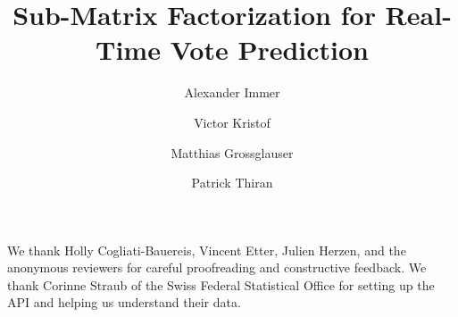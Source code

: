 \documentclass[sigconf]{acmart}
\begin{document}
\fancyhead{}

\title{Sub-Matrix Factorization for Real-Time Vote Prediction}

\author{Alexander Immer}

\author{Victor Kristof}
\authornotemark[1]

\author{Matthias Grossglauser}

\author{Patrick Thiran}

\renewcommand{\shortauthors}{Immer and Kristof, et al.}



\maketitle









\begin{acks}
	We thank Holly Cogliati-Bauereis, Vincent Etter, Julien Herzen, and the anonymous reviewers for careful proofreading and constructive feedback.
	We thank Corinne Straub of the Swiss Federal Statistical Office for setting up the API and helping us understand their data.
\end{acks}




\newpage
\clearpage
\appendix

\end{document}
